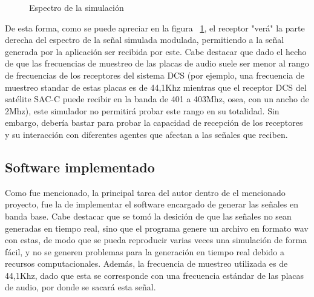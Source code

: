 \documentclass[a4paper,10pt]{article}
\begin{document}
\begin{figure}[H]
\centering
{}
\caption{Espectro de la simulación}
\label{espectroSim}
\end{figure}

\par
De esta forma, como se puede apreciar en la figura ~\ref{espectroSim}, el receptor "verá"  la parte derecha del espectro de la señal simulada modulada, permitiendo a la señal generada por la aplicación ser recibida por este. Cabe destacar que dado el hecho de que las frecuencias de muestreo de las placas de audio suele ser menor al rango de frecuencias de los receptores del sistema DCS (por ejemplo, una frecuencia de muestreo standar de estas placas es de 44,1Khz mientras que el receptor DCS del satélite SAC-C puede recibir en la banda de 401 a 403Mhz, osea, con un ancho de 2Mhz),  este simulador no permitirá probar este rango en su totalidad. Sin embargo, debería bastar para probar la capacidad de recepción de los receptores y su interacción con diferentes agentes que afectan a las señales que reciben.


\subsection{Software implementado}
Como fue mencionado, la principal tarea del autor dentro de el mencionado proyecto, fue la de implementar el software encargado de generar las señales en banda base. Cabe destacar que se tomó la desición de que las señales no sean generadas en tiempo real, sino
que el programa genere un archivo en formato wav con estas, de modo que se pueda reproducir varias veces una simulación de forma fácil, y no se generen problemas para la generación en tiempo real debido a recursos computacionales. Además, la frecuencia de muestreo
utilizada es de 44,1Khz, dado que esta se corresponde con una frecuencia estándar de las placas de audio, por donde se sacará esta señal.
\end{document}
